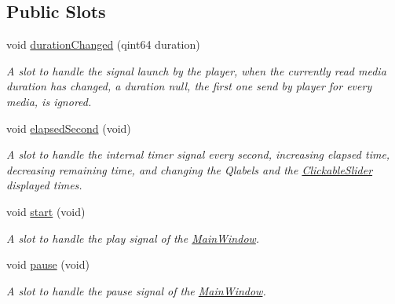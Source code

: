 \subsection*{Public Slots}
\begin{DoxyCompactItemize}
\item 
void \hyperlink{classStatusBar_af2f6ab9ea87a5337e9dad2bb39c0bb15}{duration\+Changed} (qint64 duration)
\begin{DoxyCompactList}\small\item\em A slot to handle the signal launch by the player, when the currently read media duration has changed, a duration null, the first one send by player for every media, is ignored. \end{DoxyCompactList}\item 
\mbox{\label{classStatusBar_a9f002b8c9a2d5c48260a0ebbad12f9df}} 
void \hyperlink{classStatusBar_a9f002b8c9a2d5c48260a0ebbad12f9df}{elapsed\+Second} (void)
\begin{DoxyCompactList}\small\item\em A slot to handle the internal timer signal every second, increasing elapsed time, decreasing remaining time, and changing the Qlabels and the \hyperlink{classClickableSlider}{Clickable\+Slider} displayed times. \end{DoxyCompactList}\item 
\mbox{\label{classStatusBar_a3c4e217b69264cb6b07f587af9767209}} 
void \hyperlink{classStatusBar_a3c4e217b69264cb6b07f587af9767209}{start} (void)
\begin{DoxyCompactList}\small\item\em A slot to handle the play signal of the \hyperlink{classMainWindow}{Main\+Window}. \end{DoxyCompactList}\item 
\mbox{\label{classStatusBar_ae5c8930a2b9ec0b88c48dec8f46a55d5}} 
void \hyperlink{classStatusBar_ae5c8930a2b9ec0b88c48dec8f46a55d5}{pause} (void)
\begin{DoxyCompactList}\small\item\em A slot to handle the pause signal of the \hyperlink{classMainWindow}{Main\+Window}. \end{DoxyCompactList}\item 
\mbox{\label{classStatusBar_af52f3efb90d4c83a5602dbbf210e8d79}} 

\end{DoxyCompactItemize}
